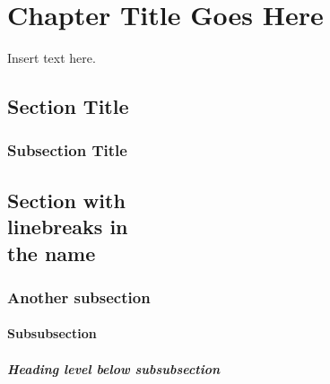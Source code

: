 \chapter{Chapter Title Goes Here}
\label{chap:chapshortname}

Insert text here.


\section{Section Title}
\label{sec:section}

\subsection{Subsection Title}
\label{sec:subsection}

\section[Optional table of contents heading]{Section with\\linebreaks in\\the name}

\subsection{Another subsection}

\subsubsection{Subsubsection}

\paragraph{Heading level below subsubsection}
\label{sec:paragraph}

